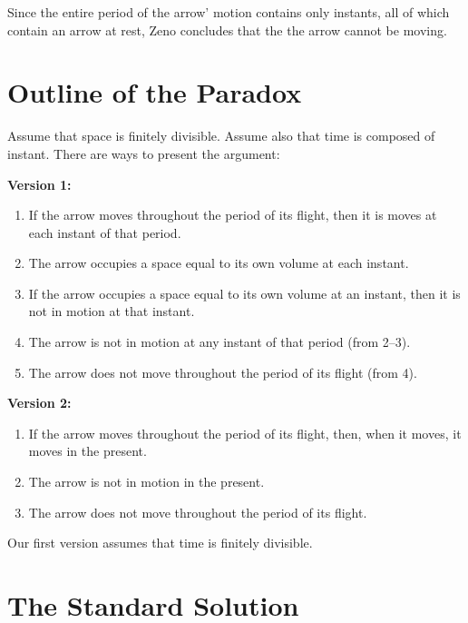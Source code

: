 \documentclass[oneside]{article}
\begin{document}
Since the entire period of the arrow' motion contains only instants, all of which contain an arrow at rest, Zeno concludes that the the arrow cannot be moving.

\section{Outline of the Paradox}\label{outline-of-the-paradox}

Assume that space is finitely divisible. Assume also that time is composed of instant. There are ways to present the argument: 

\noindent \textbf{Version 1:}\begin{enumerate}
\item If the arrow moves throughout the period of its flight, then it is moves at each instant of that period. 
\item The arrow occupies a space equal to its own volume at each instant. 
\item If the arrow occupies a space equal to its own volume at an instant, then it is not in motion at that instant. 
\item The arrow is not in motion at any instant of that period (from 2--3).
\item The arrow does not move throughout the period of its flight (from 4).
\end{enumerate}


\noindent \textbf{Version 2:}

\begin{enumerate}
\item If the arrow moves throughout the period of its flight, then, when it moves, it moves in the present. 
\item The arrow is not in motion in the present. 
\item The arrow does not move throughout the period of its flight. 
\end{enumerate}

Our first version assumes that time is finitely divisible. 

 

\section{The Standard Solution}
\end{document}
